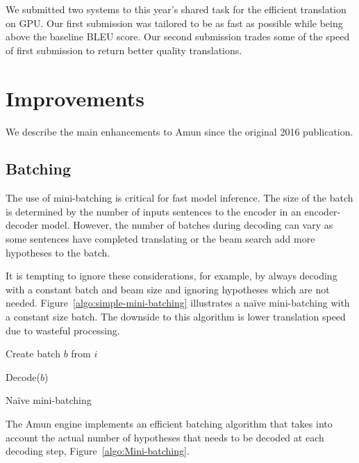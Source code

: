 \documentclass[11pt,a4paper]{article}
\begin{document}
We submitted two systems to this year's shared task for the efficient translation on GPU. Our first submission was tailored to be as fast as possible while being above the baseline BLEU score. Our second submission trades some of the speed of first submission to return better quality translations.



\section{Improvements}

We describe the main enhancements to Amun since the original 2016 publication.

\subsection{Batching}

The use of mini-batching is critical for fast model inference. The size of the batch is determined by the number of inputs sentences to the encoder in an encoder-decoder model. However, the number of batches during decoding can vary as some sentences have completed translating or the beam search add more hypotheses to the batch.

It is tempting to ignore these considerations, for example, by always decoding with a constant batch and beam size and ignoring hypotheses which are not needed. Figure~\ref{algo:simple-mini-batching} illustrates a na\"ive mini-batching with a constant size batch. The downside to this algorithm is lower translation speed due to wasteful processing.

\begin{algorithm}
\begin{algorithmic}

\State Create batch $b$ from $i$

  \State Decode($b$)
\EndWhile

\EndProcedure

\end{algorithmic}
\caption{Na\"ive mini-batching}
\label{algo:simple-mini-batching}
\end{algorithm}

The Amun engine implements an efficient batching algorithm that takes into account the actual number of hypotheses that needs to be decoded at each decoding step, Figure~\ref{algo:Mini-batching}.
\end{document}

